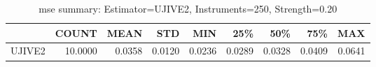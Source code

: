 \begin{table}[ht]
\centering
\caption{mse summary: Estimator=UJIVE2, Instruments=250, Strength=0.20}
\begin{tabular}{lrrrrrrrr}
\toprule
 & COUNT & MEAN & STD & MIN & 25\% & 50\% & 75\% & MAX \\
\midrule
UJIVE2 & 10.0000 & 0.0358 & 0.0120 & 0.0236 & 0.0289 & 0.0328 & 0.0409 & 0.0641 \\
\bottomrule
\end{tabular}
\end{table}
